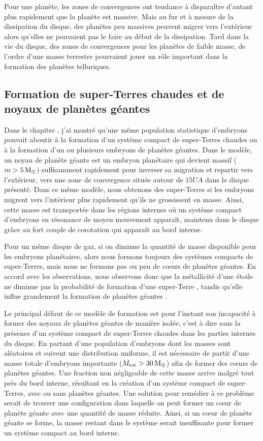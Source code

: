 Pour une planète, les zones de convergences ont tendance à disparaître d'autant plus rapidement que la planète est massive. Mais au fur et à mesure de la dissipation du disque, des planètes peu massives peuvent migrer vers l'extérieur alors qu'elles ne pouvaient pas le faire au début de la dissipation. Tard dans la vie du disque, des zones de convergences pour les planètes de faible masse, de l'ordre d'une masse terrestre pourraient jouer un rôle important dans la formation des planètes telluriques.

\subsection{Formation de super-Terres chaudes et de noyaux de planètes géantes}
Dans le chapitre , j'ai montré qu'une même population statistique d'embryons pouvait aboutir à la formation d'un système compact de super-Terres chaudes ou à la formation d'un ou plusieurs embryons de planètes géantes. Dans le modèle, un noyau de planète géante est un embryon planétaire qui devient massif ($m>5\mathrm{\thinspace M_\oplus}$) suffisamment rapidement pour inverser sa migration et repartir vers l'extérieur, vers une zone de convergence située autour de $15\unit{UA}$ dans le disque présenté. Dans ce même modèle, nous obtenons des super-Terres si les embryons migrent vers l'intérieur plus rapidement qu'ils ne grossissent en masse. Ainsi, cette masse est transportée dans les régions internes où un système compact d'embryons en résonance de moyen mouvement apparaît, maintenu dans le disque grâce au fort couple de corotation qui apparaît au bord interne.

Pour un même disque de gaz, si on diminue la quantité de masse disponible pour les embryons planétaires, alors nous formons toujours des systèmes compacts de super-Terres, mais nous ne formons pas ou peu de cœurs de planètes géantes. En accord avec les observations, nous observons donc que la métallicité d'une étoile ne diminue pas la probabilité de formation d'une super-Terre \citep{howard2012occurrence}, tandis qu'elle influe grandement la formation de planètes géantes \citep{johnson2007new}. 

\bigskip

Le principal défaut de ce modèle de formation est pour l'instant son incapacité à former des noyaux de planètes géantes de manière isolée, c'est à dire sans la présence d'un système compact de super-Terres chaudes dans les parties internes du disque. En partant d'une population d'embryons dont les masses sont aléatoires et suivent une distribution uniforme, il est nécessaire de partir d'une masse totale d'embryons importante ($M_\text{tot}>30\mathrm{\thinspace M_\oplus}$) afin de former des cœurs de planètes géantes. Une fraction non négligeable de cette masse arrive malgré tout près du bord interne, résultant en la création d'un système compact de super-Terres, avec ou sans planètes géantes. Une solution pour remédier à ce problème serait de trouver une configuration dans laquelle on peut former un cœur de planète géante avec une quantité de masse réduite. Ainsi, si un cœur de planète géante se forme, la masse restant dans le système serait insuffisante pour former un système compact au bord interne. 

